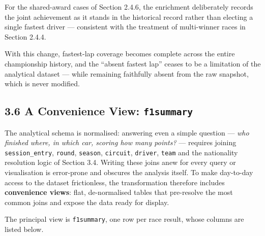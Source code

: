 \documentclass[
]{article}
\begin{document}
For the shared-award cases of Section 2.4.6, the enrichment deliberately
records the joint achievement as it stands in the historical record
rather than electing a single fastest driver --- consistent with the
treatment of multi-winner races in Section 2.4.4.

With this change, fastest-lap coverage becomes complete across the
entire championship history, and the ``absent fastest lap'' ceases to be
a limitation of the analytical dataset --- while remaining faithfully
absent from the raw snapshot, which is never modified.

\newpage

\subsection{\texorpdfstring{3.6 A Convenience View:
\texttt{f1summary}}{3.6 A Convenience View: f1summary}}\label{a-convenience-view-f1summary}

The analytical schema is normalised: answering even a simple question
--- \emph{who finished where, in which car, scoring how many points?}
--- requires joining \texttt{session\_entry}, \texttt{round},
\texttt{season}, \texttt{circuit}, \texttt{driver}, \texttt{team} and
the nationality resolution logic of Section 3.4. Writing these joins
anew for every query or visualisation is error-prone and obscures the
analysis itself. To make day-to-day access to the dataset frictionless,
the transformation therefore includes \textbf{convenience views}: flat,
de-normalised tables that pre-resolve the most common joins and expose
the data ready for display.

The principal view is \texttt{f1summary}, one row per race result, whose
columns are listed below.
\end{document}
